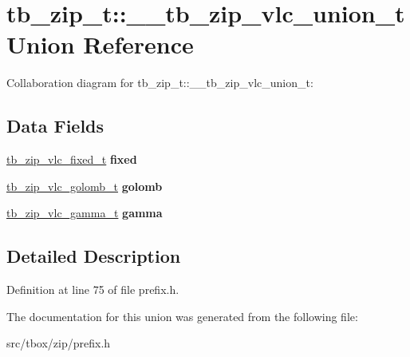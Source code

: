 \hypertarget{uniontb__zip__t_1_1____tb__zip__vlc__union__t}{\section{tb\-\_\-zip\-\_\-t\-:\-:\-\_\-\-\_\-tb\-\_\-zip\-\_\-vlc\-\_\-union\-\_\-t Union Reference}
\label{uniontb__zip__t_1_1____tb__zip__vlc__union__t}
}


Collaboration diagram for tb\-\_\-zip\-\_\-t\-:\-:\-\_\-\-\_\-tb\-\_\-zip\-\_\-vlc\-\_\-union\-\_\-t\-:
\subsection*{Data Fields}
\begin{DoxyCompactItemize}
\item 
\hypertarget{uniontb__zip__t_1_1____tb__zip__vlc__union__t_a7ad41e1bff693080b3bc30c37cb1a7d1}{\hyperlink{structtb__zip__vlc__fixed__t}{tb\-\_\-zip\-\_\-vlc\-\_\-fixed\-\_\-t} {\bfseries fixed}}\label{uniontb__zip__t_1_1____tb__zip__vlc__union__t_a7ad41e1bff693080b3bc30c37cb1a7d1}

\item 
\hypertarget{uniontb__zip__t_1_1____tb__zip__vlc__union__t_a0663a100266d94741e1f899adebe7f48}{\hyperlink{structtb__zip__vlc__golomb__t}{tb\-\_\-zip\-\_\-vlc\-\_\-golomb\-\_\-t} {\bfseries golomb}}\label{uniontb__zip__t_1_1____tb__zip__vlc__union__t_a0663a100266d94741e1f899adebe7f48}

\item 
\hypertarget{uniontb__zip__t_1_1____tb__zip__vlc__union__t_a4f9a987284cb74c4a7f6e3df6e84d2ac}{\hyperlink{structtb__zip__vlc__gamma__t}{tb\-\_\-zip\-\_\-vlc\-\_\-gamma\-\_\-t} {\bfseries gamma}}\label{uniontb__zip__t_1_1____tb__zip__vlc__union__t_a4f9a987284cb74c4a7f6e3df6e84d2ac}

\end{DoxyCompactItemize}


\subsection{Detailed Description}


Definition at line 75 of file prefix.\-h.



The documentation for this union was generated from the following file\-:\begin{DoxyCompactItemize}
\item 
src/tbox/zip/prefix.\-h\end{DoxyCompactItemize}
